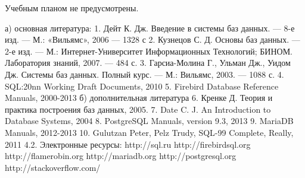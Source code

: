 \documentclass[a4paper]{article}
\begin{document}
Учебным планом не предусмотрены.

\CourseLiteratureSection

а) основная литература:
1.  Дейт К. Дж. Введение в системы баз данных. — 8-е изд. — М.: «Вильямс», 2006 — 1328 с
2.  Кузнецов С. Д. Основы баз данных. — 2-е изд. — М.: Интернет-Университет Информационных Технологий; БИНОМ. Лаборатория знаний, 2007. — 484 с.
3.  Гарсиа-Молина Г., Ульман Дж., Уидом Дж. Системы баз данных. Полный курс. — М.: Вильямс, 2003. — 1088 с.
4.  SQL:20nn Working Draft Documents, 2010
5.  Firebird Database Reference Manuals, 2000-2013
б) дополнительная литература
6.  Кренке Д. Теория и практика построения баз данных, 2005.
7.  Date C. J. An Introduction to Database Systems, 2004
8.  PostgreSQL Manuals, version 9.3, 2013
9.  MariaDB Manuals, 2012-2013
10.  Gulutzan Peter,  Pelz Trudy, SQL-99 Complete, Really, 2011
4.2. Электронные  ресурсы:
http://sql.ru
http://firebirdsql.org
http://flamerobin.org
http://mariadb.org
http://postgresql.org
http://stackoverflow.com/
\end{document}
